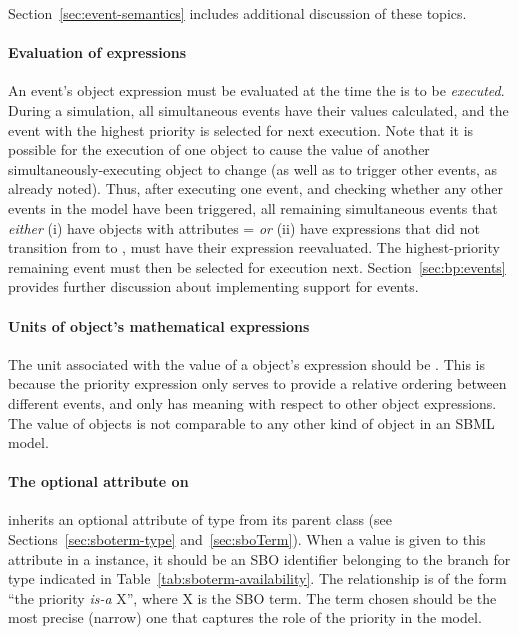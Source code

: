 Section~\ref{sec:event-semantics} includes additional discussion
of these topics.


\paragraph{Evaluation of  expressions}

An event's \Priority object  expression must be
evaluated at the time the \Event is to be \emph{executed}.  During
a simulation, all simultaneous events have their \Priority values
calculated, and the event with the highest priority is selected for
next execution.  Note that it is possible for the execution of one
\Event object to cause the \Priority value of another
simultaneously-executing \Event object to change (as well as to
trigger other events, as already noted).  Thus, after executing
one event, and checking whether any other events in the model have
been triggered, all remaining simultaneous events that
\emph{either} (i) have \Trigger objects with attributes
= \emph{or} (ii) have \Trigger
expressions that did not transition from  to
, must have their \Priority expression reevaluated.
The highest-priority remaining event must then be selected for 
execution next.  Section~\ref{sec:bp:events} provides further
discussion about implementing support for events.


\paragraph{Units of  object's mathematical
  expressions}

The unit associated with the value of a \Priority object's
 expression should be .  This is
because the priority expression only serves to provide a relative
ordering between different events, and only has meaning with
respect to other \Priority object expressions.  The value of
\Priority objects is not comparable to any other kind of object in
an SBML model.


\paragraph{The optional  attribute on }
\label{sec:priority-sboterm}

\Priority inherits an optional  attribute of type
 from its parent class \SBase (see
Sections~\ref{sec:sboterm-type} and~\ref{sec:sboTerm}).  When a
value is given to this attribute in a \Priority instance, it
should be an SBO identifier belonging to the branch for type
\Priority indicated in Table~\ref{tab:sboterm-availability}.  The
relationship is of the form ``the priority \emph{is-a} X'', where
X is the SBO term.  The term chosen should be the most precise
(narrow) one that captures the role of the priority in the model.

